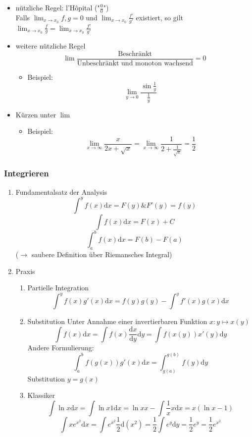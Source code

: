\documentclass[11pt]{article}
\begin{document}
\begin{itemize}
\begin{itemize}
\item nützliche Regel: l'Hôpital ("$\frac{0}{0}$") \\
        Falls $\lim_{x\to x_0} f,g = 0$ und $\lim_{x\to x_0} \frac{f'}{g'}$ existiert, so gilt $\lim_{x\to x_0}\frac{f}{g} = \lim_{x\to x_0} \frac{f'}{g'}$
\item weitere nützliche Regel \[\lim \frac{\text{Beschränkt}}{\text{Unbeschränkt und monoton wachsend}} = 0\]
\begin{itemize}
\item Beispiel: \[\lim_{y\to 0} \frac{\sin{\frac{1}{y}}}{\frac{1}{y}}\]
\end{itemize}
\item Kürzen unter $\lim$
\begin{itemize}
\item Beispiel: \[\lim_{x\to\infty} \frac{x}{2x + \sqrt{x}} = \lim_{x\to\infty}\frac{1}{2+\frac{1}{\sqrt{x}}} = \frac{1}{2}\]
\end{itemize}
\end{itemize}
\end{itemize}
\subsubsection{Integrieren}
\label{sec-1-2-3}
\begin{enumerate}
\item Fundamentalsatz der Analysis
\label{sec-1-2-3-1}
\[\int^y f(x)\mathrm{d}x = F(y) \& F'(y) = f(y)\]
\[\int f(x)\mathrm{d}x = F(x) + C\]
\[\int_a^b f(x)\mathrm{d}x = F(b) - F(a)\]
($\to$ saubere Definition über Riemansches Integral)
\item Praxis
\label{sec-1-2-3-2}
\begin{enumerate}
\item Partielle Integration
\label{sec-1-2-3-2-1}
\[\int^y f(x)g'(x)\mathrm{d}x = f(y)g(y) - \int^y f'(x)g(x)\mathrm{d}x\]
\item Substitution
\label{sec-1-2-3-2-2}
Unter Annahme einer invertierbaren Funktion $x: y\mapsto x(y)$
\[\int f(x)\mathrm{d}x = \int f(x)\frac{\mathrm{d}x}{\mathrm{d}y}\mathrm{d}y = \int f(x(y)) x'(y)\mathrm{d}y\]
Andere Formulierung: \[\int_a^b f(g(x))g'(x)\mathrm{d}x = \int_{g(a)}^{g(b)}f(y)\mathrm{d}y\]
Substitution $y=g(x)$
\item Klassiker
\label{sec-1-2-3-2-3}
\[\int \ln{x}\mathrm{d}x = \int \ln{x}1\mathrm{d}x = \ln{x}x - \int \frac{1}{x}x\mathrm{d}x = x(\ln{x} - 1)\]
\[\int x e^{x^2}\mathrm{d}x = \int e^{x^2}\frac{1}{2}\mathrm{d}(x^2) = \frac{1}{2}\int e^y \mathrm{d}y = \frac{1}{2}e^y = \frac{1}{2}e^{x^2}\]
\end{enumerate}
\end{enumerate}
\end{document}
